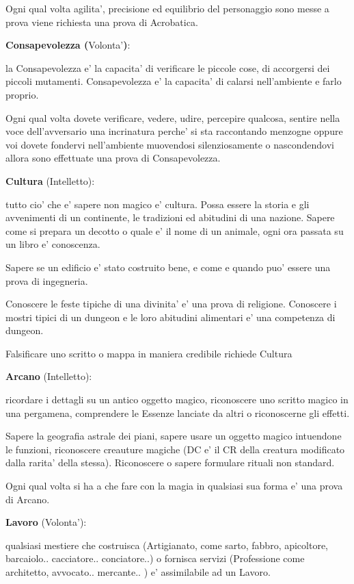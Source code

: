 \documentclass[a4paper,11pt,twoside,openany]{book}
\begin{document}
Ogni qual volta agilita', precisione ed equilibrio del personaggio sono messe a prova viene richiesta una prova di Acrobatica.

\textbf{Consapevolezza (}Volonta'\textbf{)}:

la Consapevolezza e' la capacita' di verificare le piccole cose, di accorgersi dei piccoli mutamenti. Consapevolezza e' la capacita' di calarsi nell'ambiente e farlo proprio.

Ogni qual volta dovete verificare, vedere, udire, percepire qualcosa, sentire nella voce dell'avversario una incrinatura perche' si sta raccontando menzogne oppure voi dovete fondervi nell'ambiente muovendosi silenziosamente o nascondendovi allora sono effettuate una prova di Consapevolezza.

\textbf{Cultura} (Intelletto):

tutto cio' che e' sapere non magico e' cultura. Possa essere la storia e gli avvenimenti di un continente, le tradizioni ed abitudini di una nazione. Sapere come si prepara un decotto o quale e' il nome di un animale, ogni ora passata su un libro e' conoscenza.

Sapere se un edificio e' stato costruito bene, e come e quando puo' essere una prova di ingegneria.

Conoscere le feste tipiche di una divinita' e' una prova di religione. Conoscere i mostri tipici di un dungeon e le loro abitudini alimentari e' una competenza di dungeon.

Falsificare uno scritto o mappa in maniera credibile richiede Cultura

\textbf{Arcano} (Intelletto):

ricordare i dettagli su un antico oggetto magico, riconoscere uno scritto magico in una pergamena, comprendere le Essenze lanciate da altri o riconoscerne gli effetti.

Sapere la geografia astrale dei piani, sapere usare un oggetto magico intuendone le funzioni, riconoscere creauture magiche (DC e' il CR della creatura modificato dalla rarita' della stessa). Riconoscere o sapere formulare rituali non standard.

Ogni qual volta si ha a che fare con la magia in qualsiasi sua forma e' una prova di Arcano.

\textbf{Lavoro} (Volonta'):

qualsiasi mestiere che costruisca (Artigianato, come sarto, fabbro, apicoltore, barcaiolo.. cacciatore.. conciatore..) o fornisca servizi (Professione come architetto, avvocato.. mercante.. ) e' assimilabile ad un Lavoro.
\end{document}
